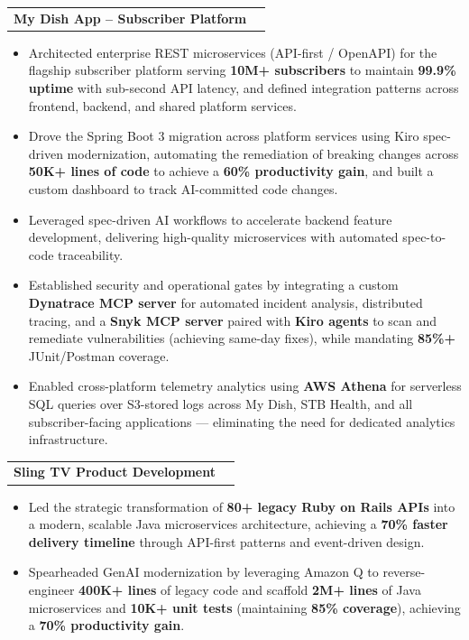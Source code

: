 \documentclass[letterpaper,11pt]{article}
\makeatletter
\newcommand{\resumeItem}[1]{
  \item\small{
    {#1 \vspace{-2pt}}
  }
}
\newcommand{\resumeProjectHeading}[2]{
    \item
    \begin{tabular*}{1.001\textwidth}{l@{\extracolsep{\fill}}r}
      \small#1 & \textbf{\small #2}\\
    \end{tabular*}\vspace{-7pt}
}
\newcommand{\resumeItemListStart}{\begin{itemize}}
\newcommand{\resumeItemListEnd}{\end{itemize}\vspace{-5pt}}
\makeatother
\begin{document}
\vspace{-12pt}
\resumeProjectHeading
   {\textbf{My Dish App -- Subscriber Platform}}{}
\resumeItemListStart
\resumeItem{Architected enterprise REST microservices (API-first / OpenAPI) for the flagship subscriber platform serving \textbf{10M+ subscribers} to maintain \textbf{99.9\% uptime} with sub-second API latency, and defined integration patterns across frontend, backend, and shared platform services.}
\resumeItem{Drove the Spring Boot 3 migration across platform services using Kiro spec-driven modernization, automating the remediation of breaking changes across \textbf{50K+ lines of code} to achieve a \textbf{60\% productivity gain}, and built a custom dashboard to track AI-committed code changes.}
\resumeItem{Leveraged spec-driven AI workflows to accelerate backend feature development, delivering high-quality microservices with automated spec-to-code traceability.}
\resumeItem{Established security and operational gates by integrating a custom \textbf{Dynatrace MCP server} for automated incident analysis, distributed tracing, and a \textbf{Snyk MCP server} paired with \textbf{Kiro agents} to scan and remediate vulnerabilities (achieving same-day fixes), while mandating \textbf{85\%+} JUnit/Postman coverage.}
  \resumeItem{Enabled cross-platform telemetry analytics using \textbf{AWS Athena} for serverless SQL queries over S3-stored logs across My Dish, STB Health, and all subscriber-facing applications — eliminating the need for dedicated analytics infrastructure.}
\resumeItemListEnd

\vspace{-12pt}
\resumeProjectHeading
   {\textbf{Sling TV Product Development}}{}
\resumeItemListStart
\resumeItem{Led the strategic transformation of \textbf{80+ legacy Ruby on Rails APIs} into a modern, scalable Java microservices architecture, achieving a \textbf{70\% faster delivery timeline} through API-first patterns and event-driven design.}

\resumeItem{Spearheaded GenAI modernization by leveraging Amazon Q to reverse-engineer \textbf{400K+ lines} of legacy code and scaffold \textbf{2M+ lines} of Java microservices and \textbf{10K+ unit tests} (maintaining \textbf{85\% coverage}), achieving a \textbf{70\% productivity gain}.}

\resumeItemListEnd
\end{document}

